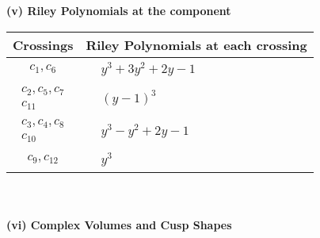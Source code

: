 \documentclass[1p]{elsarticle_modified}
\theoremstyle{definition}
\begin{document}
\newpage\renewcommand{\arraystretch}{1}
\flushleft \textbf{(v) Riley Polynomials at the component}\newline \\
\begin{tabular}{m{50pt}|m{274pt}}
Crossings & \hspace{64pt}Riley Polynomials at each crossing \\
\hline $$\begin{aligned}c_{1},c_{6}\end{aligned}$$&$\begin{aligned}
&y^3+3 y^2+2 y-1
\end{aligned}$\\
\hline $$\begin{aligned}c_{2},c_{5},c_{7}\\c_{11}\end{aligned}$$&$\begin{aligned}
&(y-1)^3
\end{aligned}$\\
\hline $$\begin{aligned}c_{3},c_{4},c_{8}\\c_{10}\end{aligned}$$&$\begin{aligned}
&y^3- y^2+2 y-1
\end{aligned}$\\
\hline $$\begin{aligned}c_{9},c_{12}\end{aligned}$$&$\begin{aligned}
&y^3
\end{aligned}$\\
\hline
\end{tabular}\\~\\
\newpage\flushleft \textbf{(vi) Complex Volumes and Cusp Shapes}
\end{document}
